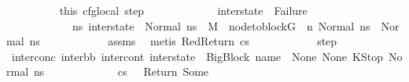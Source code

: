 \begin{isabellebody}
\isanewline
\ \ \ \ \ \ \ \ \isamarkupfalse%
\ this\ cfg{\isacharunderscore}{\kern0pt}local\ step{}\ \isamarkupfalse%
\ \isanewline
\ \ \ \ \ \ \ \ \ \ {\isachardoublequoteopen}inter{\isacharunderscore}{\kern0pt}state\ {\isasymnoteq}\ Failure\ \ {\isasymand}\isanewline
\ \ \ \ \ \ \ \ \ \ \ \ {\isacharparenleft}{\kern0pt}{\isasymforall}ns{}{\isacharprime}{\kern0pt}{\isachardot}{\kern0pt}\ inter{\isacharunderscore}{\kern0pt}state\ {\isacharequal}{\kern0pt}\ Normal\ ns{}{\isacharprime}{\kern0pt}\ {\isasymlongrightarrow}\ {\isacharparenleft}{\kern0pt}M{\isacharcomma}{\kern0pt}{\isasymLambda}{\isacharcomma}{\kern0pt}{\isasymGamma}{\isacharcomma}{\kern0pt}{\isasymOmega}\ {\isasymturnstile}\ {\isasymlangle}node{\isacharunderscore}{\kern0pt}to{\isacharunderscore}{\kern0pt}block{\isacharparenleft}{\kern0pt}G{\isacharparenright}{\kern0pt}\ {\isacharbang}{\kern0pt}\ n{\isacharcomma}{\kern0pt}\ Normal\ ns{}{\isasymrangle}\ {\isacharbrackleft}{\kern0pt}{\isasymrightarrow}{\isacharbrackright}{\kern0pt}\ Normal\ ns{}{\isacharprime}{\kern0pt}{\isacharparenright}{\kern0pt}{\isacharparenright}{\kern0pt}{\isachardoublequoteclose}\isanewline
\ \ \ \ \ \ \ \ \ \ \isamarkupfalse%
\ assms\ \isamarkupfalse%
\ {\isacharparenleft}{\kern0pt}metis\ RedReturn\ {\isacartoucheopen}cs{}\ {\isacharequal}{\kern0pt}\ {\isacharbrackleft}{\kern0pt}{\isacharbrackright}{\kern0pt}{\isacartoucheclose}{\isacharparenright}{\kern0pt}\isanewline
\isanewline
\ \ \ \ \ \ \ \ \isamarkupfalse%
\ step{}\ \isamarkupfalse%
\ inter{\isacharunderscore}{\kern0pt}conc{\isacharcolon}{\kern0pt}\ {\isachardoublequoteopen}{\isacharparenleft}{\kern0pt}inter{\isacharunderscore}{\kern0pt}bb{\isacharcomma}{\kern0pt}\ inter{\isacharunderscore}{\kern0pt}cont{\isacharcomma}{\kern0pt}\ inter{\isacharunderscore}{\kern0pt}state{\isacharparenright}{\kern0pt}\ {\isacharequal}{\kern0pt}\ {\isacharparenleft}{\kern0pt}{\isacharparenleft}{\kern0pt}BigBlock\ name\ {\isacharbrackleft}{\kern0pt}{\isacharbrackright}{\kern0pt}\ None\ None{\isacharparenright}{\kern0pt}{\isacharcomma}{\kern0pt}\ KStop{\isacharcomma}{\kern0pt}\ Normal\ ns{}{\isacharparenright}{\kern0pt}{\isachardoublequoteclose}\ \isanewline
\ \ \ \ \ \ \ \ \ \ \isamarkupfalse%
\ {\isacartoucheopen}cs{}\ {\isacharequal}{\kern0pt}\ {\isacharbrackleft}{\kern0pt}{\isacharbrackright}{\kern0pt}{\isacartoucheclose}\ Return\ Some\isanewline

\end{isabellebody}
